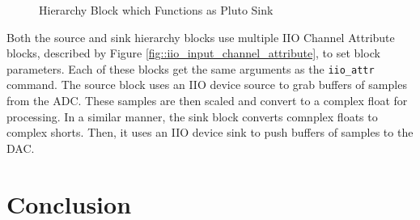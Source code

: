 \documentclass{article}
\begin{document}
\begin{figure}[H]
	\centerline{}
	\caption{Hierarchy Block which Functions as Pluto Sink}
	\label{fig::pluto_iio_device_sink}
\end{figure}

Both the source and sink hierarchy blocks use multiple IIO Channel Attribute blocks, described by Figure \ref{fig::iio_input_channel_attribute}, to set block parameters. Each of these blocks get the same arguments as the \texttt{iio\_attr} command. The source block uses an IIO device source to grab buffers of samples from the ADC. These samples are then scaled and convert to a complex float for processing. In a similar manner, the sink block converts comnplex floats to complex shorts. Then, it uses an IIO device sink to push buffers of samples to the DAC. 

\section{Conclusion}

\nocite{analog_devices_libiio_error}

{}
%
	
\end{document}

